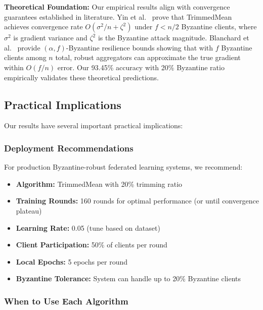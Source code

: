 \documentclass{ieeeaccess}
\begin{document}
\textbf{Theoretical Foundation:} Our empirical results align with convergence guarantees established in literature. Yin et al.~\cite{yin2018byzantine} prove that TrimmedMean achieves convergence rate $O(\sigma^2/n + \zeta^2)$ under $f < n/2$ Byzantine clients, where $\sigma^2$ is gradient variance and $\zeta^2$ is the Byzantine attack magnitude. Blanchard et al.~\cite{blanchard2017machine} provide $(\alpha, f)$-Byzantine resilience bounds showing that with $f$ Byzantine clients among $n$ total, robust aggregators can approximate the true gradient within $O(f/n)$ error. Our 93.45\% accuracy with 20\% Byzantine ratio empirically validates these theoretical predictions.

\subsection{Practical Implications}

Our results have several important practical implications:

\subsubsection{Deployment Recommendations}

For production Byzantine-robust federated learning systems, we recommend:
\begin{itemize}
    \item \textbf{Algorithm:} TrimmedMean with 20\% trimming ratio
    \item \textbf{Training Rounds:} 160 rounds for optimal performance (or until convergence plateau)
    \item \textbf{Learning Rate:} 0.05 (tune based on dataset)
    \item \textbf{Client Participation:} 50\% of clients per round
    \item \textbf{Local Epochs:} 5 epochs per round
    \item \textbf{Byzantine Tolerance:} System can handle up to 20\% Byzantine clients
\end{itemize}

\subsubsection{When to Use Each Algorithm}
\end{document}
